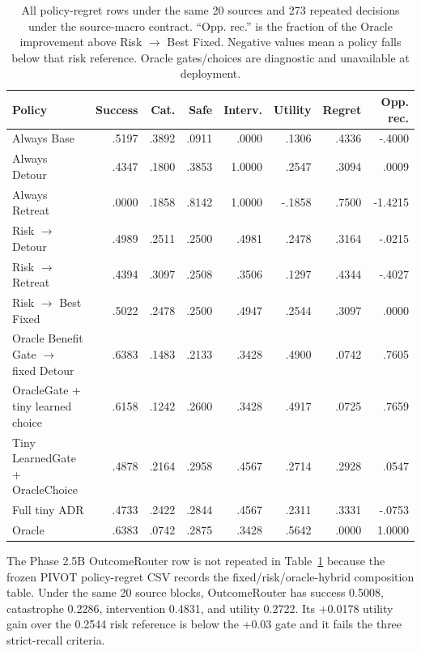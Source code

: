 \begin{table}[H]
\centering
\scriptsize
\setlength{\tabcolsep}{3.5pt}
\begin{tabular}{@{}lrrrrrrr@{}}
\toprule
Policy & Success & Cat. & Safe & Interv. & Utility & Regret & Opp. rec. \\
\midrule
Always Base & .5197 & .3892 & .0911 & .0000 & .1306 & .4336 & -.4000 \\
Always Detour & .4347 & .1800 & .3853 & 1.0000 & .2547 & .3094 & .0009 \\
Always Retreat & .0000 & .1858 & .8142 & 1.0000 & -.1858 & .7500 & -1.4215 \\
Risk $\rightarrow$ Detour & .4989 & .2511 & .2500 & .4981 & .2478 & .3164 & -.0215 \\
Risk $\rightarrow$ Retreat & .4394 & .3097 & .2508 & .3506 & .1297 & .4344 & -.4027 \\
Risk $\rightarrow$ Best Fixed & .5022 & .2478 & .2500 & .4947 & .2544 & .3097 & .0000 \\
Oracle Benefit Gate $\rightarrow$ fixed Detour & .6383 & .1483 & .2133 & .3428 & .4900 & .0742 & .7605 \\
OracleGate + tiny learned choice & .6158 & .1242 & .2600 & .3428 & .4917 & .0725 & .7659 \\
Tiny LearnedGate + OracleChoice & .4878 & .2164 & .2958 & .4567 & .2714 & .2928 & .0547 \\
Full tiny ADR & .4733 & .2422 & .2844 & .4567 & .2311 & .3331 & -.0753 \\
Oracle & .6383 & .0742 & .2875 & .3428 & .5642 & .0000 & 1.0000 \\
\bottomrule
\end{tabular}
\caption{All policy-regret rows under the same 20 sources and 273 repeated
decisions under the
source-macro contract. ``Opp. rec.'' is the fraction of the Oracle improvement
above Risk $\rightarrow$ Best Fixed. Negative values mean a policy falls below
that risk reference. Oracle gates/choices are diagnostic and unavailable at
deployment.}
\label{tab:policy-full}
\end{table}

The Phase 2.5B OutcomeRouter row is not repeated in
Table~\ref{tab:policy-full} because the frozen PIVOT policy-regret CSV records
the fixed/risk/oracle-hybrid composition table. Under the same 20 source blocks,
OutcomeRouter has success 0.5008, catastrophe 0.2286, intervention 0.4831, and
utility 0.2722. Its +0.0178 utility gain over the 0.2544 risk reference is below
the +0.03 gate and it fails the three strict-recall criteria.

